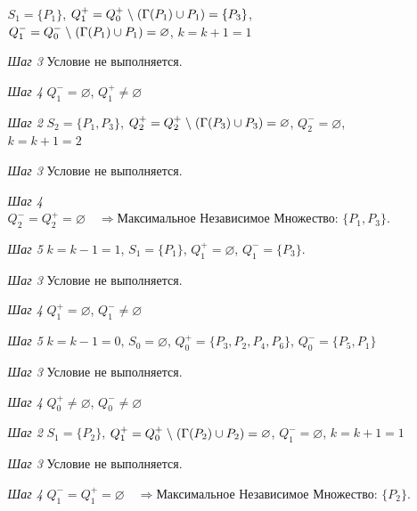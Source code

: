 \documentclass{article}
\begin{document}
\begin{enumerate}
\begin{enumerate}
        $S_1 = \{P_1\}$,
        \quad  $Q_1^{+} = Q_0^{+} \hspace{1mm}\backslash\hspace{1mm} (\Gamma (P_1) \cup P_1) = \{P_3\}$,
        \quad  $Q_1^{-} = Q_0^{-} \hspace{1mm}\backslash\hspace{1mm} (\Gamma (P_1) \cup P_1) = \varnothing$,
        \quad  $k = k + 1 = 1$
    \item[\textit{Шаг 3}] Условие не выполняется.
    \item[\textit{Шаг 4}] $Q_1^{-} = \varnothing$,
    \quad$Q_1^{+} \neq \varnothing$
    \item[\textit{Шаг 2}]
        $S_2 = \{P_1, P_3\}$,
        \quad  $Q_2^{+} = Q_2^{+} \hspace{1mm}\backslash\hspace{1mm} (\Gamma (P_3) \cup P_3) = \varnothing$,
        \quad  $Q_2^{-} = \varnothing$,
        $k = k + 1 = 2$
    \item[\textit{Шаг 3}] Условие не выполняется.
    \item[\textit{Шаг 4}] $Q_2^{-} = Q_2^{+} = \varnothing\quad\Longrightarrow \textbf{Максимальное Независимое Множество: }\{P_1, P_3\}$.
    \item[\textit{Шаг 5}] $k = k - 1 = 1$,
        \quad $S_1 = \{P_1\}$,
        \quad $Q_1^{+} = \varnothing$,
        \quad  $Q_1^{-} = \{P_3\}$.
    \item[\textit{Шаг 3}] Условие не выполняется.
    \item[\textit{Шаг 4}] $Q_1^{+} = \varnothing$,
    \quad$Q_1^{-} \neq \varnothing$
    \item[\textit{Шаг 5}] $k = k - 1 = 0$,
        \quad $S_0 =\varnothing$,
        \quad  $Q_0^{+} = \{P_3,P_2,P_4,P_6\}$,
        \quad  $Q_0^{-} = \{P_5,P_1\}$
    \item[\textit{Шаг 3}]  Условие не выполняется.
    \item[\textit{Шаг 4}] $Q_0^{+} \neq \varnothing$,
    \quad$Q_0^{-} \neq \varnothing$
    \item[\textit{Шаг 2}]
        $S_1 = \{P_2\}$,
        \quad  $Q_1^{+} = Q_0^{+} \hspace{1mm}\backslash\hspace{1mm} (\Gamma (P_2) \cup P_2) = \varnothing$,
        \quad  $Q_1^{-} = \varnothing$,
        \quad  $k = k + 1 = 1$
    \item[\textit{Шаг 3}] Условие не выполняется.
    \item[\textit{Шаг 4}] $Q_1^{-} = Q_1^{+} = \varnothing\quad\Longrightarrow \textbf{Максимальное Независимое Множество: }\{P_2\}$.

\end{enumerate}
\end{enumerate}
\end{document}
